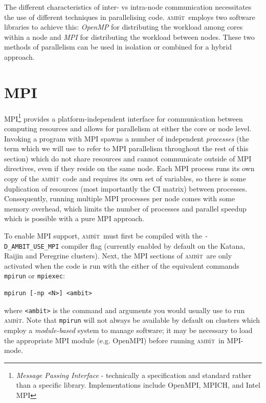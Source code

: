 \documentclass{report}
\newcommand{\ambit}{\textsc{amb}{\footnotesize i}\textsc{t}}
\begin{document}
The different characteristics of inter- vs intra-node communication necessitates the use of different
techniques in parallelising code. \ambit\ employs two software libraries to achieve this: \textit{OpenMP} 
for distributing the workload among cores within a node and \textit{MPI} for distributing the workload
between nodes. These two methods of parallelism can be used in isolation or combined for a hybrid
approach. 

\section{MPI}
\label{sec:MPI}

MPI\footnote{\textit{Message Passing Interface} - technically a specification and standard rather than a
specific library. Implementations include OpenMPI, MPICH, and Intel MPI} provides a platform-independent
interface for communication between computing resources and allows for parallelism at either the core or
node level. Invoking a program with MPI spawns a number of independent \textit{processes} (the term which
we will use to refer to MPI parallelism throughout the rest of this section) which do not share resources
and cannot communicate outside of MPI directives, even if they reside on the same node. Each MPI process
runs its own copy of the \ambit\ code and requires its own set of variables, so there is some duplication
of resources (most importantly the CI matrix) between processes. Consequently, running multiple MPI
processes per node comes with some memory overhead, which limits the number of processes and parallel
speedup which is possible with a pure MPI approach.

To enable MPI support, \ambit\ must first be compiled with the \texttt{-D\_AMBIT\_USE\_MPI} compiler flag
(currently enabled by default on the Katana, Raijin and Peregrine clusters). Next, the MPI sections of
\ambit\ are only activated when the code is run with the either of the equivalent commands 
\texttt{mpirun} or \texttt{mpiexec}:

\begin{verbatim}
mpirun [-np <N>] <ambit>
\end{verbatim}

where \texttt{<ambit>} is the command and arguments you would usually use to run \ambit. Note that
\texttt{mpirun} will not always be available by default on clusters which employ a \textit{module-based}
system to manage software; it may be necessary to load the appropriate MPI module (e.g. OpenMPI) before
running \ambit\ in MPI-mode.
\end{document}
